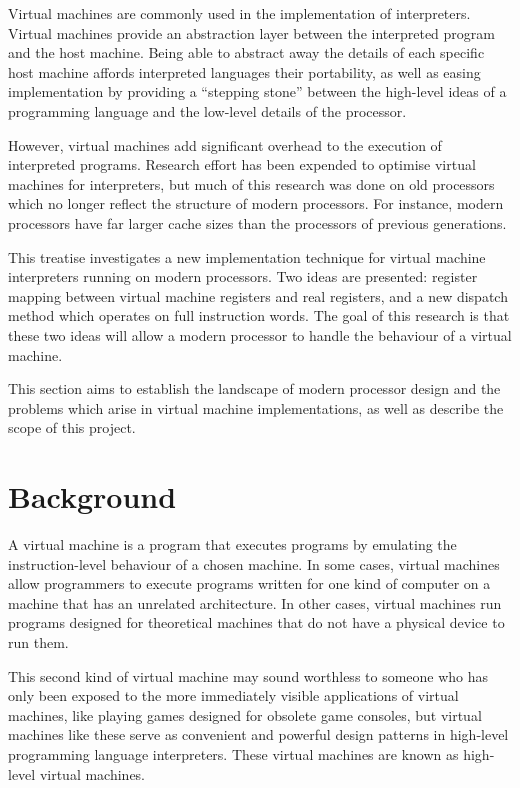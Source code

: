 	Virtual machines are commonly used in the implementation of interpreters. Virtual machines provide an abstraction layer between the interpreted program and the host machine. Being able to abstract away the details of each specific host machine affords interpreted languages their portability, as well as easing implementation by providing a ``stepping stone'' between the high-level ideas of a programming language and the low-level details of the processor.
	
	However, virtual machines add significant overhead to the execution of interpreted programs. Research effort has been expended to optimise virtual machines for interpreters, but much of this research was done on old processors which no longer reflect the structure of modern processors. For instance, modern processors have far larger cache sizes than the processors of previous generations.
	
	This treatise investigates a new implementation technique for virtual machine interpreters running on modern processors. Two ideas are presented: register mapping between virtual machine registers and real registers, and a new dispatch method which operates on full instruction words. The goal of this research is that these two ideas will allow a modern processor to handle the behaviour of a virtual machine.
	
	This section aims to establish the landscape of modern processor design and the problems which arise in virtual machine implementations, as well as describe the scope of this project.
	
	\section{Background}
		A virtual machine is a program that executes programs by emulating the instruction-level behaviour of a chosen machine. In some cases, virtual machines allow programmers to execute programs written for one kind of computer on a machine that has an unrelated architecture. In other cases, virtual machines run programs designed for theoretical machines that do not have a physical device to run them.
		
		This second kind of virtual machine may sound worthless to someone who has only been exposed to the more immediately visible applications of virtual machines, like playing games designed for obsolete game consoles, but virtual machines like these serve as convenient and powerful design patterns in high-level programming language interpreters. These virtual machines are known as high-level virtual machines.
		
